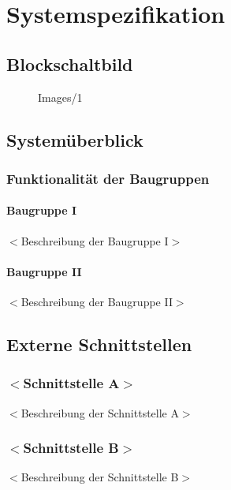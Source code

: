 
	\chapter{Systemspezifikation}
	\section{Blockschaltbild}
	\begin{figure}[ht]
	{Images/1}
	\end{figure}
    \label{Abbildung}
	\section{Systemüberblick}
	\subsection{Funktionalität der Baugruppen}
	\subsubsection{Baugruppe I}
	$<$Beschreibung der Baugruppe I$>$
	\subsubsection{Baugruppe II}
	$<$Beschreibung der Baugruppe II$>$
	\section{Externe Schnittstellen}
	\subsection{$<$Schnittstelle A$>$}
	$<$Beschreibung der Schnittstelle A$>$
	\subsection{$<$Schnittstelle B$>$}
	$<$Beschreibung der Schnittstelle B$>$
